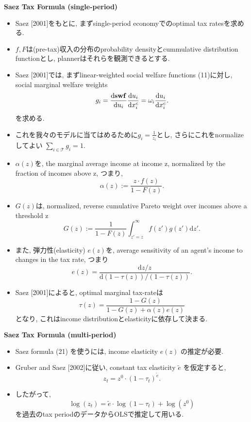 \documentclass[unicode,aspectratio=169,11pt]{beamer}
\begin{document}
\begin{frame}{}{}
{\bf Saez Tax Formula (single-period)}
\begin{itemize}
    \item Saez [2001]をもとに, まずsingle-period economyでのoptimal tax ratesを求める.
    \item $f, F$は(pre-tax)収入の分布のprobability densityとcummulative distribution functionとし, plannerはそれらを観測できるとする.
    \item Saez [2001]では, まずlinear-weighted social welfare functions (11)に対し, social marginal welfare weights
    \[ g_i = \frac{\mathrm{d}{\bf swf}}{\mathrm{d} u_i} \frac{\mathrm{d} u_i}{\mathrm{d} x_{i}^c} = \omega_i \frac{\mathrm{d} u_i}{\mathrm{d} x_{i}^c}.  \]
    を求める.
    \item これを我々のモデルに当てはめるために$g_i = \frac{1}{z_i}$とし, さらにこれをnormalizeしてよい $\sum_{i \in \mathscr{T}}g_i = 1$.
\end{itemize}
\end{frame}

\begin{frame}{}{}
    \begin{itemize}
        \item $\alpha(z)$を, the marginal average income at income z, normalized by the fraction of incomes above z, つまり,
        \[ \alpha(z) := \frac{z \cdot f(z)}{1 - F(z)}. \tag{18}\]
        \item $G(z)$は, normalized, reverse cumulative Pareto weight over incomes above a threshold z
        \[ G(z) := \frac{1}{1 - F(z)}\int_{z' = z}^\infty f(z')g(z') \mathrm{d}z'. \tag{19}\]
        \item また, 弾力性(elasticity) $e(z)$を, average sensitivity of an agent’s income to changes in the tax rate, つまり
        \[e(z) = \frac{\mathrm{d}z / z}{\mathrm{d}(1 - \tau(z))/(1-\tau(z))}. \tag{20}\]
        \item Saez [2001]によると, optimal marginal tax-rateは
        \[ \tau(z) = \frac{1 - G(z)}{1 - G(z) + \alpha(z) e(z)} \tag{21}\]
        となり, これはincome distributionとelasticityに依存して決まる.
    \end{itemize}
\end{frame}

\begin{frame}{}{}
{\bf Saez Tax Formula (multi-period)}
\begin{itemize}
    \item Saez formula (21) を使うには, income elasticity $e(z)$ の推定が必要.
    \item Gruber and Saez [2002]に従い, constant tax elasticity $\tilde{e}$ を仮定すると, 
    \[ z_t = z^0 \cdot (1- \tau_t)^{\tilde{e}}. \tag{22} \]
    \item したがって, 
    \[ \log(z_t) = \tilde{e} \cdot \log(1 - \tau_t) + \log(z^0) \tag{23} \]
    を過去のtax periodのデータからOLSで推定して用いる.
\end{itemize}
\end{frame}
\end{document}
